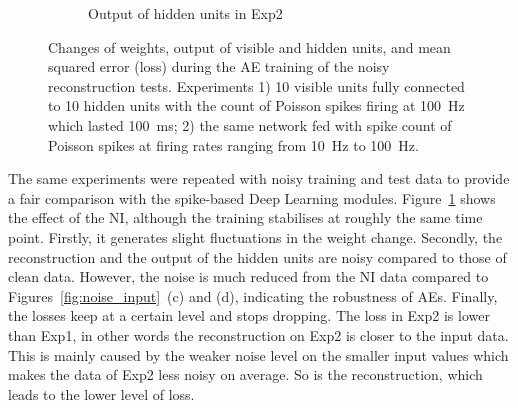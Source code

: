 \begin{figure}
\begin{subfigure}[t]{0.48\textwidth}
		\caption{Output of hidden units in Exp2}
	\end{subfigure}
	\caption[AE-NI training of the reconstruction tests.]{Changes of weights, output of visible and hidden units, and mean squared error (loss) during the AE training of the noisy reconstruction tests. 
		Experiments 1) 10 visible units fully connected to 10 hidden units with the count of Poisson spikes firing at 100~Hz which lasted 100~ms; 2) the same network fed with spike count of Poisson spikes at firing rates ranging from 10~Hz to 100~Hz.}
	\label{fig:ae_noise}
\end{figure}

The same experiments were repeated with noisy training and test data to provide a fair comparison with the spike-based Deep Learning modules.
Figure~\ref{fig:ae_noise} shows the effect of the NI, although the training stabilises at roughly the same time point.
Firstly, it generates slight fluctuations in the weight change.
Secondly, the reconstruction and the output of the hidden units are noisy compared to those of clean data.
However, the noise is much reduced from the NI data compared to Figures~\ref{fig:noise_input}~(c) and (d), indicating the robustness of AEs. 
Finally, the losses keep at a certain level and stops dropping.
The loss in Exp2 is lower than Exp1, in other words the reconstruction on Exp2 is closer to the input data.
This is mainly caused by the weaker noise level on the smaller input values which makes the data of Exp2 less noisy on average.
So is the reconstruction, which leads to the lower level of loss.
